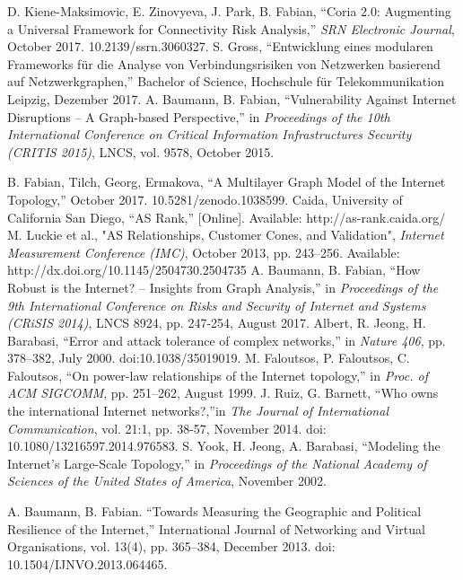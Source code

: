 \documentclass[conference, 11pt]{IEEEtran}
\begin{document}
\begin{thebibliography}{00}
 D. Kiene-Maksimovic, E. Zinovyeva, J. Park, B. Fabian, ``Coria 2.0: Augmenting a Universal Framework for Connectivity Risk Analysis,'' \textit{SRN Electronic Journal}, October 2017. 10.2139/ssrn.3060327.  %
S. Gross, ``Entwicklung eines modularen Frameworks für die Analyse von Verbindungsrisiken von Netzwerken basierend auf Netzwerkgraphen,'' Bachelor of Science, Hochschule für Telekommunikation Leipzig, Dezember 2017. %
A. Baumann, B. Fabian, ``Vulnerability Against Internet Disruptions – A Graph-based Perspective,''  in \textit{Proceedings of the 10th International Conference on Critical Information Infrastructures Security (CRITIS 2015)}, LNCS, vol. 9578, October 2015.

B. Fabian, Tilch, Georg, Ermakova, ``A Multilayer Graph Model of the Internet Topology,'' October 2017. 10.5281/zenodo.1038599. %
Caida, University of California San Diego, ``AS Rank,'' [Online].  Available: http://as-rank.caida.org/ %
M. Luckie et al., "AS Relationships, Customer Cones, and Validation", \textit{Internet Measurement Conference (IMC)}, October 2013, pp. 243--256. Available: http://dx.doi.org/10.1145/2504730.2504735 %
A. Baumann, B. Fabian, “How Robust is the Internet? – Insights
from Graph Analysis,” in \textit{Proceedings of the 9th International
Conference on Risks and Security of Internet and Systems (CRiSIS
2014)}, LNCS 8924, pp. 247-254, August 2017. %
Albert, R. Jeong, H. Barabasi, ``Error and attack tolerance of complex networks,'' in \textit{Nature 406}, pp. 378–382, July 2000. doi:10.1038/35019019. %
M. Faloutsos, P. Faloutsos, C. Faloutsos, “On power-law relationships of the Internet topology,”  in \textit{Proc. of ACM SIGCOMM}, pp. 251–262, August 1999. %
J. Ruiz, G. Barnett, ``Who owns the international Internet networks?,''in \textit{The Journal of International
Communication}, vol. 21:1, pp. 38-57, November 2014. doi:
10.1080/13216597.2014.976583. %
S. Yook, H. Jeong, A. Barabasi, ``Modeling the Internet's Large-Scale Topology,'' in \textit{Proceedings of the National Academy of Sciences of the United States of America}, November 2002.

A. Baumann, B. Fabian. ``Towards Measuring the Geographic and Political Resilience of the Internet,'' International Journal of Networking and Virtual Organisations, vol. 13(4), pp. 365–384, December 2013. doi: 10.1504/IJNVO.2013.064465. %


\end{thebibliography}
\end{document}
